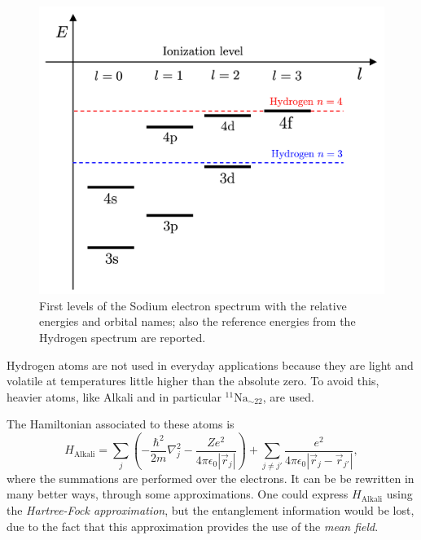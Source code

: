 \begin{figure}[b]
\centering
    \includegraphics[width=0.61\linewidth]{images/Alkali_spectrum.png}
    \caption{First levels of the Sodium electron spectrum with the relative energies and orbital names; also the reference energies from the Hydrogen spectrum are reported.}
    \label{fig:alkali_spectrum}
\end{figure}


Hydrogen atoms are not used in everyday applications because they are light and volatile at temperatures little higher than the absolute zero. To avoid this, heavier atoms, like Alkali and in particular $^{11} \text{Na}_{\sim 22}$, are used. 

\noindent The Hamiltonian associated to these atoms is
\begin{equation}
    H_\text{Alkali} = \sum_{j} \left( - \frac{\hbar^2}{2m} \nabla_j^2 - \frac{Ze^2}{4 \pi \epsilon_0 \left| \Vec{r}_j\right|}\right) + \sum_{j\neq j'} \frac{e^2}{4 \pi \epsilon_0 \left| \Vec{r}_j - \Vec{r}_{j'}\right|}, 
    \label{eq:alkali_hamiltonian}
\end{equation}
where the summations are performed over the electrons. It can be be rewritten in many better ways, through some approximations. One could express $H_\text{Alkali}$ using the \textit{Hartree-Fock approximation}, but the entanglement information would be lost, due to the fact that this approximation provides the use of the \textit{mean field}.

